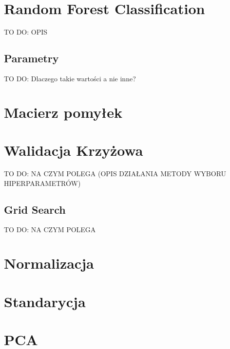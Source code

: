 \documentclass{article}
\begin{document}
\section{Random Forest Classification}
TO DO: OPIS
\subsection{Parametry}
TO DO: Dlaczego takie wartości a nie inne?

\section{Macierz pomyłek}

\section{Walidacja Krzyżowa}
TO DO: NA CZYM POLEGA (OPIS DZIAŁANIA METODY WYBORU HIPERPARAMETRÓW)
\subsection{Grid Search}
TO DO: NA CZYM POLEGA


\section{Normalizacja}
\section{Standarycja}
\section{PCA}




\end{document}
